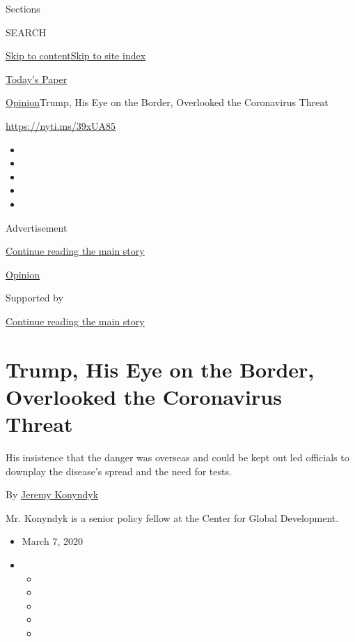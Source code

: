 Sections

SEARCH

\protect\hyperlink{site-content}{Skip to
content}\protect\hyperlink{site-index}{Skip to site index}

\href{https://myaccount.nytimes3xbfgragh.onion/auth/login?response_type=cookie\&client_id=vi}{}

\href{https://www.nytimes3xbfgragh.onion/section/todayspaper}{Today's
Paper}

\href{/section/opinion}{Opinion}\textbar{}Trump, His Eye on the Border,
Overlooked the Coronavirus Threat

\url{https://nyti.ms/39xUA85}

\begin{itemize}
\item
\item
\item
\item
\item
\end{itemize}

Advertisement

\protect\hyperlink{after-top}{Continue reading the main story}

\href{/section/opinion}{Opinion}

Supported by

\protect\hyperlink{after-sponsor}{Continue reading the main story}

\hypertarget{trump-his-eye-on-the-border-overlooked-the-coronavirus-threat}{%
\section{Trump, His Eye on the Border, Overlooked the Coronavirus
Threat}\label{trump-his-eye-on-the-border-overlooked-the-coronavirus-threat}}

His insistence that the danger was overseas and could be kept out led
officials to downplay the disease's spread and the need for tests.

By \href{https://www.cgdev.org/expert/jeremy-konyndyk}{Jeremy Konyndyk}

Mr. Konyndyk is a senior policy fellow at the Center for Global
Development.

\begin{itemize}
\item
  March 7, 2020
\item
  \begin{itemize}
  \item
  \item
  \item
  \item
  \item
  \end{itemize}
\end{itemize}


